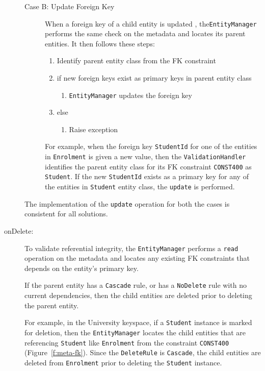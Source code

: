 \begin{description}
\begin{description}
		\item[Case B: Update Foreign Key] When a foreign key of a child entity is
		updated , the\newline  \texttt{EntityManager} performs the same check on the
		metadata and locates its parent entities. It then follows these steps:
		\begin{enumerate}
		  \item Identify parent entity class from the \ac{FK} constraint
		  \item if new foreign keys exist as primary keys in parent entity class
			\begin{enumerate}
				\item \texttt{EntityManager} updates  the foreign key
			\end{enumerate}
		  \item else 
			\begin{enumerate}
				\item Raise exception
			\end{enumerate}
		\end{enumerate}

		For example, when the foreign key \texttt{StudentId} for one of the entities
		in \texttt{Enrolment} is given a new value,  then the \texttt{ValidationHandler} 
		identifies the parent entity class for its \ac{FK} constraint
		\texttt{CONST400} as \texttt{Student}.  If the new \texttt{StudentId} 
		exists as a primary key for any
		 of the  entities in \texttt{Student} entity class,  the \texttt{update} is
		 performed.
		
		\end{description}
		The implementation of the \texttt{update} operation for both the cases is
		consistent for all solutions.
		
		\item[onDelete:]To validate referential integrity, the \texttt{EntityManager}
		performs a \texttt{read} operation on the metadata and locates  any existing
		\ac{FK} constraints that depends on the entity's primary key.
		
		If the parent  entity has a \texttt{Cascade} rule,  or has a
		\texttt{NoDelete} rule with no current dependencies,  then the child entities
		are deleted prior to deleting the parent entity. 
		
		For example,  in the University keyspace,  if a 
		\texttt{Student} instance is marked for deletion,  then the \texttt{EntityManager}
		locates the child entities that are referencing \texttt{Student} like
		\texttt{Enrolment} from the constraint \texttt{CONST400}
		(Figure~\ref{f:meta-fk}).  Since the \texttt{DeleteRule} is \texttt{Cascade}, 
		the child entities are deleted from \texttt{Enrolment} prior to deleting the
		\texttt{Student} instance. 
		\end{description}
		
